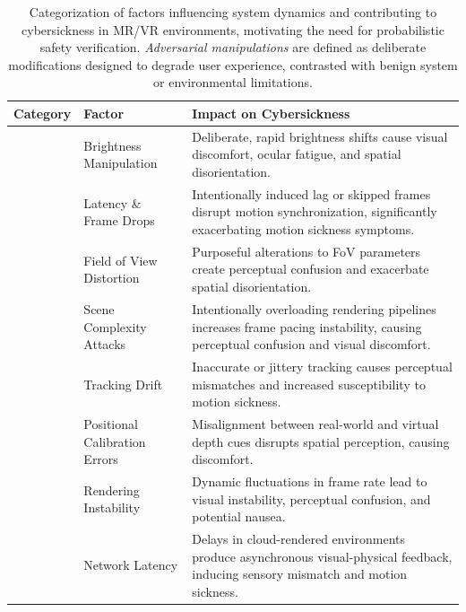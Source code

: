 \documentclass{vgtc}                          %
\begin{document}
\begin{table}[t]
\centering
\tiny
\renewcommand{\arraystretch}{1.2}
\setlength{\tabcolsep}{5pt}
\caption{Categorization of factors influencing system dynamics and contributing to cybersickness in MR/VR environments, motivating the need for probabilistic safety verification. \textit{Adversarial manipulations} are defined as deliberate modifications designed to degrade user experience, contrasted with benign system or environmental limitations.\protect\footnotemark}
\label{tab:cybersickness_factors}
\begin{tabular}{p{2cm} p{3.4cm} p{}}
\hline
\textbf{Category} & \textbf{Factor} & \textbf{Impact on Cybersickness} \\
\hline
{} 
 & Brightness Manipulation & Deliberate, rapid brightness shifts cause visual discomfort, ocular fatigue, and spatial disorientation. \\
 & Latency \& Frame Drops & Intentionally induced lag or skipped frames disrupt motion synchronization, significantly exacerbating motion sickness symptoms. \\
 & Field of View Distortion & Purposeful alterations to FoV parameters create perceptual confusion and exacerbate spatial disorientation. \\
 & Scene Complexity Attacks & Intentionally overloading rendering pipelines increases frame pacing instability, causing perceptual confusion and visual discomfort. \\
 \hline
{}  
 & Tracking Drift & Inaccurate or jittery tracking causes perceptual mismatches and increased susceptibility to motion sickness. \\
 & Positional Calibration Errors & Misalignment between real-world and virtual depth cues disrupts spatial perception, causing discomfort. \\
 & Rendering Instability & Dynamic fluctuations in frame rate lead to visual instability, perceptual confusion, and potential nausea. \\
 & Network Latency & Delays in cloud-rendered environments produce asynchronous visual-physical feedback, inducing sensory mismatch and motion sickness. \\

\end{tabular}
\end{table}
\end{document}
